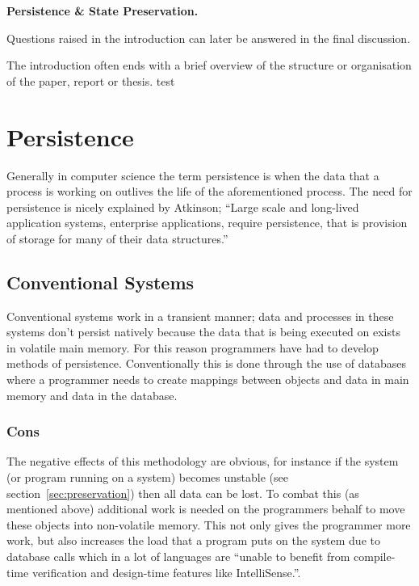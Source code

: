 \documentclass[a4paper,12pt]{article}
\newenvironment{boxit}{\begin{lrbox}{\savepar}
        \begin{minipage}[b]{4.6in}}
        {\end{minipage}\end{lrbox}\fbox{\usebox{\savepar}}}
\begin{document}
\begin{center}
\begin{boxit}
\textbf{Persistence \& State Preservation.}
\end{boxit}
\end{center}

Questions raised in the introduction can later be answered in the final discussion.

The introduction often ends with a brief overview of the structure or organisation of
the paper, report or thesis.
test~\citep{ADearle}
%
\section{Persistence}\label{sec:persistence}
Generally in computer science the term persistence is when the data that a process is working on outlives the life of the aforementioned  process. 
The need for persistence is nicely explained by Atkinson;
``Large scale and long-lived application systems, enterprise applications, require persistence, that is provision of storage for many of their data structures.''~\citep[page 1]{persistenceandjava}

\subsection{Conventional Systems}
Conventional systems work in a transient manner; data and processes in these systems don't persist natively because the data that is being executed on exists in volatile main memory. For this reason programmers have had to develop methods of persistence. Conventionally this is done through the use of databases where a programmer needs to create mappings between objects and data in main memory and data in the database.
\subsubsection{Cons}\label{sec:cons}
The negative effects of this methodology are obvious, for instance if the system (or program running on a system) becomes unstable (see section~\ref{sec:preservation}) then all data can be lost. To combat this (as mentioned above) additional work is needed on the programmers behalf to move these objects into non-volatile memory. This not only gives the programmer more work, but also increases the load that a program puts on the system due to database calls which in a lot of languages are ``unable to benefit from compile-time verification and design-time features like IntelliSense.''\citep[page 1]{linqsql}.
\end{document}
